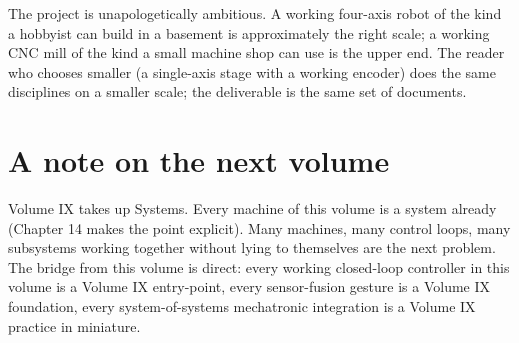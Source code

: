 The project is unapologetically ambitious. A working four-axis robot of the kind a hobbyist can build in a basement is approximately the right scale; a working CNC mill of the kind a small machine shop can use is the upper end. The reader who chooses smaller (a single-axis stage with a working encoder) does the same disciplines on a smaller scale; the deliverable is the same set of documents.

\section*{A note on the next volume}

Volume IX takes up Systems. Every machine of this volume is a system already (Chapter 14 makes the point explicit). Many machines, many control loops, many subsystems working together without lying to themselves are the next problem. The bridge from this volume is direct: every working closed-loop controller in this volume is a Volume IX entry-point, every sensor-fusion gesture is a Volume IX foundation, every system-of-systems mechatronic integration is a Volume IX practice in miniature.

\vspace{1cm}
